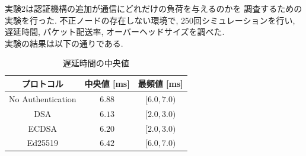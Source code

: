 実験2は認証機構の追加が通信にどれだけの負荷を与えるのかを
調査するための実験を行った. 
不正ノードの存在しない環境で, 250回シミュレーションを行い, 
遅延時間, パケット配送率, オーバーヘッドサイズを調べた. \\
\indent 実験の結果は以下の通りである. \\

\begin{longtable}{ccc}
  \caption{遅延時間の中央値}
  \label{tab:exp2_delay} \\
  \endfirsthead
  \hline
  \multicolumn{1}{c}{プロトコル} &
  \multicolumn{1}{c}{中央値 [ms]} &
  \multicolumn{1}{c}{最頻値 [ms]} \\ \hline \hline
  No Authentication & $6.88$ & $[6.0, 7.0)$ \\
  DSA & $6.13$ & $[2.0, 3.0)$ \\
  ECDSA & $6.20$ & $[2.0, 3.0)$ \\
  Ed25519 & $6.42$ & $[6.0, 7.0)$ \\ \hline
\end{longtable}

